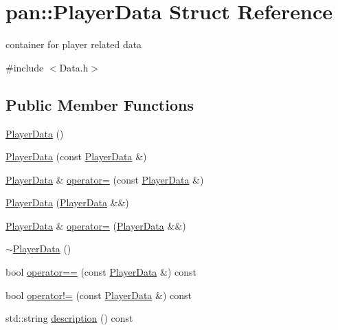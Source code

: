 \hypertarget{structpan_1_1_player_data}{}\section{pan\+:\+:Player\+Data Struct Reference}
\label{structpan_1_1_player_data}


container for player related data  




{\ttfamily \#include $<$Data.\+h$>$}

\subsection*{Public Member Functions}
\begin{DoxyCompactItemize}
\item 
\hyperlink{structpan_1_1_player_data_a7bd4ebf550c2dd24d62fe443a2494a7b}{Player\+Data} ()
\item 
\hyperlink{structpan_1_1_player_data_ac73829f7cb3159a7b4c73c5e1692c8dd}{Player\+Data} (const \hyperlink{structpan_1_1_player_data}{Player\+Data} \&)
\item 
\hyperlink{structpan_1_1_player_data}{Player\+Data} \& \hyperlink{structpan_1_1_player_data_af777062227dfc1e659b35dd3fd630028}{operator=} (const \hyperlink{structpan_1_1_player_data}{Player\+Data} \&)
\item 
\hyperlink{structpan_1_1_player_data_af4aeaccb9684a634521e4e9cf140e769}{Player\+Data} (\hyperlink{structpan_1_1_player_data}{Player\+Data} \&\&)
\item 
\hyperlink{structpan_1_1_player_data}{Player\+Data} \& \hyperlink{structpan_1_1_player_data_aa4adc4de5012f149b3bc5ec52db85478}{operator=} (\hyperlink{structpan_1_1_player_data}{Player\+Data} \&\&)
\item 
\hyperlink{structpan_1_1_player_data_ae8c8ca3b7b8a98f238748a6031a08724}{$\sim$\+Player\+Data} ()
\item 
bool \hyperlink{structpan_1_1_player_data_af931fa445725740d81b14edbff520f00}{operator==} (const \hyperlink{structpan_1_1_player_data}{Player\+Data} \&) const
\item 
bool \hyperlink{structpan_1_1_player_data_a6bc35b4e97c2d0f26f03f32e04fcf3f0}{operator!=} (const \hyperlink{structpan_1_1_player_data}{Player\+Data} \&) const
\item 
std\+::string \hyperlink{structpan_1_1_player_data_a6b3e95835968243be8b690eacb732d5b}{description} () const
\end{DoxyCompactItemize}
